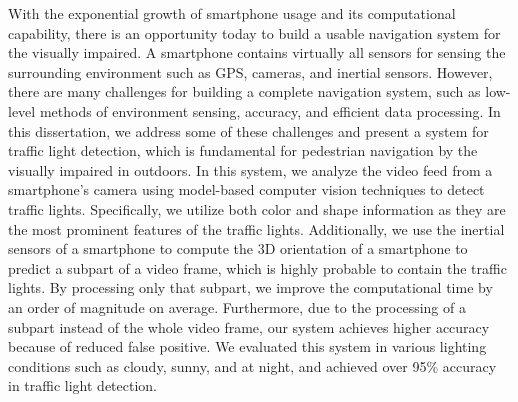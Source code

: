 \summary

With the exponential growth of smartphone usage and its computational capability, there is an opportunity today to build a usable navigation system for the visually impaired. 
A smartphone contains virtually all sensors for sensing the surrounding environment such as GPS, cameras, and inertial sensors. 
However, there are many challenges for building a complete navigation system, such as low-level methods of environment sensing, accuracy, and efficient data processing.
In this dissertation, we address some of these challenges and present a system for traffic light detection, which is fundamental for pedestrian navigation by the visually impaired in outdoors. 
In this system, we analyze the video feed from a smartphone's camera using model-based computer vision techniques to detect traffic lights. 
Specifically, we utilize both color and shape information as they are the most prominent features of the traffic lights.
Additionally, we use the inertial sensors of a smartphone to compute the 3D orientation of a smartphone to predict a subpart of a video frame, which is highly probable to contain the traffic lights. 
By processing only that subpart, we improve the computational time by an order of magnitude on average. 
Furthermore, due to the processing of a subpart instead of the whole video frame, our system achieves higher accuracy because of reduced false positive.
We evaluated this system in various lighting conditions such as cloudy, sunny, and at night, and achieved over 95\% accuracy in traffic light detection.  



